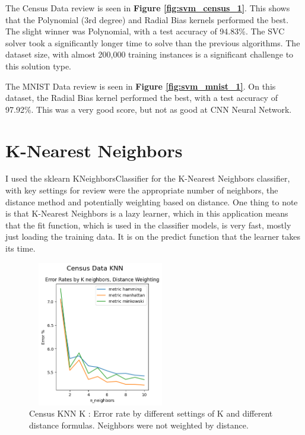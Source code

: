 \documentclass[letterpaper]{article} %
\begin{document}
The Census Data review is seen in \textbf{Figure \ref{fig:svm_census_1}}.  This shows that the Polynomial (3rd degree) and Radial Bias kernels performed the best.  The slight winner was Polynomial, with a test accuracy of  94.83\%.  The SVC solver took a significantly longer time to solve than the previous algorithms.  The dataset size, with almost 200,000 training instances is a significant challenge to this solution type.

The MNIST Data review is seen in \textbf{Figure \ref{fig:svm_mnist_1}}.  On this dataset, the Radial Bias kernel performed the best,  with a test accuracy of 97.92\%.  This was a very good score, but not as good at CNN Neural Network.

\section{K-Nearest Neighbors}
I used the sklearn KNeighborsClassifier for the K-Nearest Neighbors classifier, with key settings for review were the appropriate number of neighbors, the distance method and potentially weighting based on distance.  One thing to note is that K-Nearest Neighbors is a lazy learner, which in this application means that the fit function, which is used in the classifier models, is very fast, mostly just loading the training data.  It is on the predict function that the learner takes its time.

\begin{figure}[h]
\centering
\includegraphics[width=2.5in, height=2.5in]{figures/Census_Data_KNN_knn_1.png}
\caption{Census KNN K :  Error rate by different settings of K and different distance formulas.  Neighbors were not weighted by distance.  }
\label{fig:census_knn_1}
\end{figure}
\end{document}
